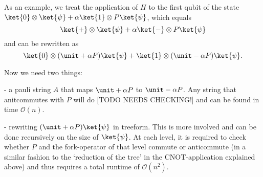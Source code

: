 As an example, we treat the application of $H$ to the first qubit of the state $\ket{0} \otimes \ket{\psi} + \alpha \ket{1} \otimes P \ket{\psi}$, which equals
\[
\ket{+} \otimes \ket{\psi} + \alpha \ket{-} \otimes P \ket{\psi}
\]
and can be rewritten as
\[
    \ket{0} \otimes (\unit + \alpha P) \ket{\psi} + \ket{1} \otimes (\unit - \alpha P) \ket{\psi}
    .
\]

Now we need two things:

- a pauli string $A$ that maps $\unit + \alpha P$ to $\unit - \alpha P$. Any string that anitcommutes with $P$ will do [TODO NEEDS CHECKING!] and can be found in time $\mathcal{O}(n)$.

- rewriting $(\unit + \alpha P) \ket{\psi}$ in treeform. This is more involved and can be done recursively on the size of $\ket{\psi}$. At each level, it is required to check whether $P$ and the fork-operator of that level commute or anticommute (in a similar fashion to the `reduction of the tree' in the CNOT-application explained above) and thus requires a total runtime of $\mathcal{O}(n^2)$.




